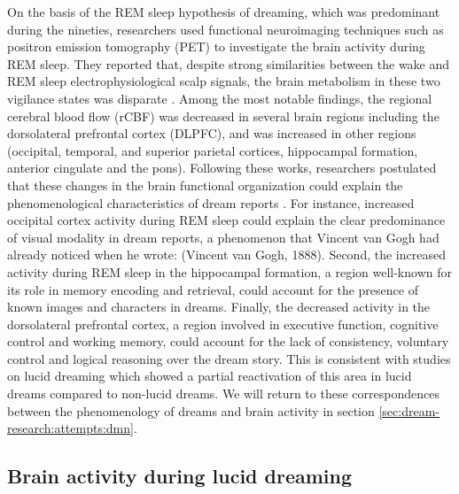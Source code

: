 On the basis of the REM sleep hypothesis of dreaming, which was predominant during the nineties, researchers used functional neuroimaging techniques such as positron emission tomography (PET) to investigate the brain activity during REM sleep. They reported that, despite strong similarities between the wake and REM sleep electrophysiological scalp signals, the brain metabolism in these two vigilance states was disparate \citep{maquet_functional_1996, braun_regional_1997}. Among the most notable findings, the regional cerebral blood flow (rCBF) was decreased in several brain regions including the dorsolateral prefrontal cortex (DLPFC), and was increased in other regions (occipital, temporal, and superior parietal cortices, hippocampal formation, anterior cingulate and the pons). Following these works, researchers postulated that these changes in the brain functional organization could explain the phenomenological characteristics of dream reports \citep{hobson_dreaming_2000, nir_dreaming_2010}. For instance, increased occipital cortex activity during REM sleep could explain the clear predominance of visual modality in dream reports, a phenomenon that Vincent van Gogh had already noticed when he wrote:  (Vincent van Gogh, 1888). Second, the increased activity during REM sleep in the hippocampal formation, a region well-known for its role in memory encoding and retrieval, could account for the presence of known images and characters in dreams. Finally, the decreased activity in the dorsolateral prefrontal cortex, a region involved in executive function, cognitive control and working memory, could account for the lack of consistency, voluntary control and logical reasoning over the dream story. This is consistent with studies on lucid dreaming which showed a partial reactivation of this area in lucid dreams compared to non-lucid dreams. We will return to these correspondences between the phenomenology of dreams and brain activity in section \ref{sec:dream-research:attempts:dmn}.

\subsection{Brain activity during lucid dreaming}
\label{sec:dream-research:attempts:ba-lucid}

